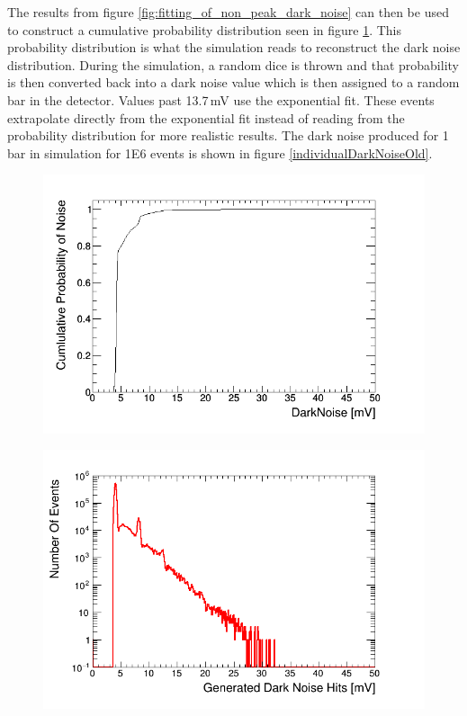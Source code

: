 The results from figure \ref{fig:fitting_of_non_peak_dark_noise} can then be used to construct a cumulative probability distribution seen in figure \ref{fig:cumulative_prob_dark}. This probability distribution is what the simulation reads to reconstruct the dark noise distribution. During the simulation, a random dice is thrown and that probability is then converted back into a dark noise value which is then assigned to a random bar in the detector. Values past 13.7\,mV use the exponential fit. These events extrapolate directly from the exponential fit instead of reading from the probability distribution for more realistic results. The dark noise produced for 1 bar in simulation for 1E6 events is shown in figure \ref{individualDarkNoiseOld}. 
\begin{figure}[!h]
 \centering
 \includegraphics[width=0.8\linewidth]{cumulative_prob_dark_noise.png}
 \label{fig:cumulative_prob_dark}
\end{figure}

\begin{figure}[!h]
 \centering
 \includegraphics[width=0.8\linewidth]{Chapter4/Figs/darkNoiseLog.png}
 \label{fig:individualDarkNoiseOld}
\end{figure}

